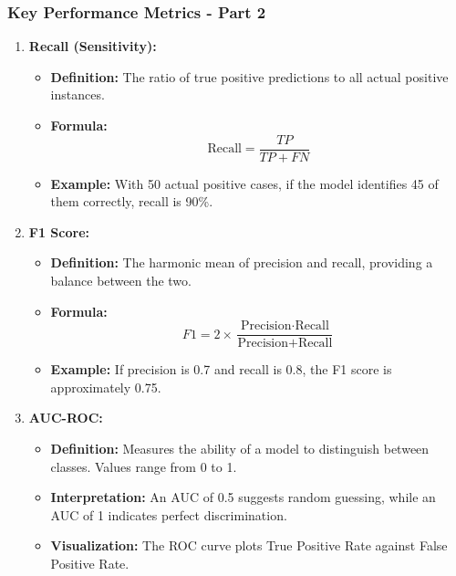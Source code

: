 \documentclass[aspectratio=169]{beamer}
\begin{document}
\begin{frame}[fragile]
    \frametitle{Key Performance Metrics - Part 2}
    \begin{enumerate}[resume]
        \item \textbf{Recall (Sensitivity):}
            \begin{itemize}
                \item \textbf{Definition:} The ratio of true positive predictions to all actual positive instances.
                \item \textbf{Formula:}
                \begin{equation}
                    \text{Recall} = \frac{TP}{TP + FN}
                \end{equation}
                \item \textbf{Example:} With 50 actual positive cases, if the model identifies 45 of them correctly, recall is 90\%.
            \end{itemize}
            
        \item \textbf{F1 Score:}
            \begin{itemize}
                \item \textbf{Definition:} The harmonic mean of precision and recall, providing a balance between the two.
                \item \textbf{Formula:}
                \begin{equation}
                    F1 = 2 \times \frac{\text{Precision} \cdot \text{Recall}}{\text{Precision} + \text{Recall}}
                \end{equation}
                \item \textbf{Example:} If precision is 0.7 and recall is 0.8, the F1 score is approximately 0.75.
            \end{itemize}

        \item \textbf{AUC-ROC:}
            \begin{itemize}
                \item \textbf{Definition:} Measures the ability of a model to distinguish between classes. Values range from 0 to 1.
                \item \textbf{Interpretation:} An AUC of 0.5 suggests random guessing, while an AUC of 1 indicates perfect discrimination.
                \item \textbf{Visualization:} The ROC curve plots True Positive Rate against False Positive Rate.
            \end{itemize}
    \end{enumerate}
\end{frame}
\end{document}
